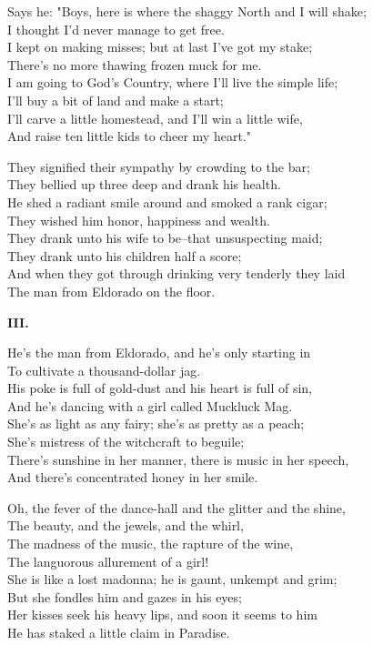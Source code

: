 \begin{poemblock}
Says he:  "Boys, here is where the shaggy North and I will shake;\\
\idt I thought I'd never manage to get free.\\
I kept on making misses; but at last I've got my stake;\\
\idt There's no more thawing frozen muck for me.\\
I am going to God's Country, where I'll live the simple life;\\
\idt I'll buy a bit of land and make a start;\\
I'll carve a little homestead, and I'll win a little wife,\\
\idt And raise ten little kids to cheer my heart."

They signified their sympathy by crowding to the bar;\\
\idt They bellied up three deep and drank his health.\\
He shed a radiant smile around and smoked a rank cigar;\\
\idt They wished him honor, happiness and wealth.\\
They drank unto his wife to be--that unsuspecting maid;\\
\idt They drank unto his children half a score;\\
And when they got through drinking very tenderly they laid\\
\idt The man from Eldorado on the floor.

\textbf{III.}

He's the man from Eldorado, and he's only starting in\\
\idt To cultivate a thousand-dollar jag.\\
His poke is full of gold-dust and his heart is full of sin,\\
\idt And he's dancing with a girl called Muckluck Mag.\\
She's as light as any fairy; she's as pretty as a peach;\\
\idt She's mistress of the witchcraft to beguile;\\
There's sunshine in her manner, there is music in her speech,\\
\idt And there's concentrated honey in her smile.

Oh, the fever of the dance-hall and the glitter and the shine,\\
\idt The beauty, and the jewels, and the whirl,\\
The madness of the music, the rapture of the wine,\\
\idt The languorous allurement of a girl!\\
She is like a lost madonna; he is gaunt, unkempt and grim;\\
\idt But she fondles him and gazes in his eyes;\\
Her kisses seek his heavy lips, and soon it seems to him\\
\idt He has staked a little claim in Paradise.


\end{poemblock}

